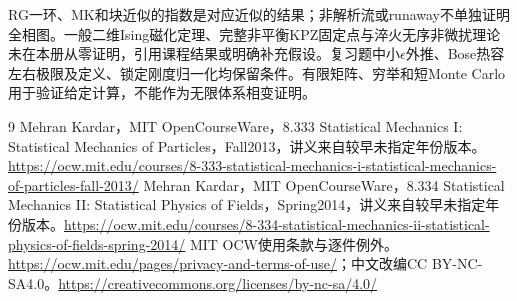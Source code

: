 RG一环、MK和块近似的指数是对应近似的结果；非解析流或runaway不单独证明全相图。一般二维Ising磁化定理、完整非平衡KPZ固定点与淬火无序非微扰理论未在本册从零证明，引用课程结果或明确补充假设。复习题中小$\epsilon$外推、Bose热容左右极限及定义、锁定刚度归一化均保留条件。有限矩阵、穷举和短Monte Carlo用于验证给定计算，不能作为无限体系相变证明。
\begin{thebibliography}{9}
 Mehran Kardar，MIT OpenCourseWare，8.333 Statistical Mechanics I: Statistical Mechanics of Particles，Fall2013，讲义来自较早未指定年份版本。\url{https://ocw.mit.edu/courses/8-333-statistical-mechanics-i-statistical-mechanics-of-particles-fall-2013/}
 Mehran Kardar，MIT OpenCourseWare，8.334 Statistical Mechanics II: Statistical Physics of Fields，Spring2014，讲义来自较早未指定年份版本。\url{https://ocw.mit.edu/courses/8-334-statistical-mechanics-ii-statistical-physics-of-fields-spring-2014/}
 MIT OCW使用条款与逐件例外。\url{https://ocw.mit.edu/pages/privacy-and-terms-of-use/}；中文改编CC BY-NC-SA4.0。\url{https://creativecommons.org/licenses/by-nc-sa/4.0/}
\end{thebibliography}
